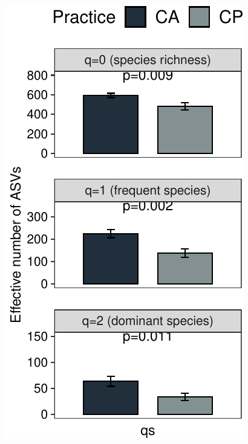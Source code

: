 \documentclass[]{interact}
\theoremstyle{plain}%
\theoremstyle{definition}
\theoremstyle{remark}
\begin{document}
\begin{center}\includegraphics{Doc_pdf_files/figure-latex/unnamed-chunk-27-1} \end{center}
\end{document}
